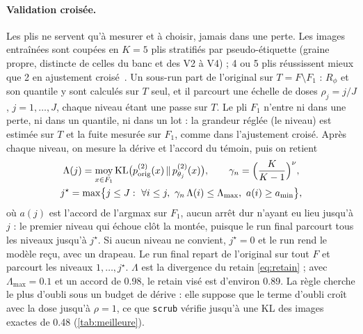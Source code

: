 \documentclass[11pt,a4paper]{article}
\newcommand{\KL}{\operatorname{KL}}
\newcommand{\Exp}{\operatorname*{moy}}
\newcommand{\orig}{\mathrm{orig}}
\newcommand{\code}[1]{\texttt{#1}}
\begin{document}
\paragraph{Validation croisée.} Les plis ne servent qu'à mesurer et à choisir, jamais dans une perte.
Les images entraînées sont coupées en $K=5$ plis stratifiés par pseudo-étiquette (graine propre,
distincte de celles du banc et des V2 à V4) ; 4 ou 5 plis réussissent mieux que 2 en ajustement
croisé~\cite{chernozhukov2018dml}. Un sous-run part de l'original sur $T=F\setminus F_1$ :
$R_\phi$ et son quantile y sont calculés sur $T$ seul, et il parcourt une échelle de doses
$\rho_j=j/J$, $j=1,\dots,J$, chaque niveau étant une passe sur $T$. Le pli $F_1$ n'entre ni dans une
perte, ni dans un quantile, ni dans un lot : la grandeur réglée (le niveau) est estimée sur $T$ et la
fuite mesurée sur $F_1$, comme dans l'ajustement croisé. Après chaque niveau, on mesure la dérive et
l'accord du témoin, puis on retient
\begin{equation}\label{eq:v5select}
  \begin{gathered}
  \Lambda(j)=\Exp_{x\in F_1}\KL\bigl(p^{(2)}_\orig(x)\,\|\,p^{(2)}_{\theta_j}(x)\bigr),\qquad
  \gamma_n=\Bigl(\frac{K}{K-1}\Bigr)^{\nu},\\
  j^\star=\max\bigl\{j\le J:\ \forall i\le j,\ \gamma_n\,\Lambda(i)\le\Lambda_{\max},\ a(i)\ge a_{\min}\bigr\},
  \end{gathered}
\end{equation}
où $a(j)$ est l'accord de l'argmax sur $F_1$, aucun arrêt dur n'ayant eu lieu jusqu'à $j$ : le
premier niveau qui échoue clôt la montée, puisque le run final parcourt tous les niveaux jusqu'à
$j^\star$. Si aucun niveau ne convient, $j^\star=0$ et le run rend le modèle reçu, avec un drapeau. Le run final repart de
l'original sur tout $F$ et parcourt les niveaux $1,\dots,j^\star$. $\Lambda$ est la divergence du
retain \eqref{eq:retain} ; avec $\Lambda_{\max}=\num{0.1}$ et un accord de \num{0.98}, le retain visé
est d'environ \num{0.89}. La règle cherche le plus d'oubli sous un budget de dérive : elle suppose que
le terme d'oubli croît avec la dose jusqu'à $\rho=1$, ce que \code{scrub} vérifie jusqu'à une KL des
images exactes de \num{0.48} (\cref{tab:meilleure}).
\end{document}
